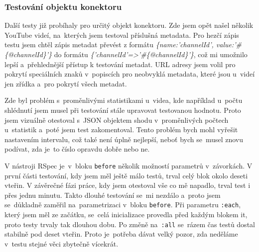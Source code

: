 \subsubsection{Testování objektu konektoru}
\par Další testy již probíhaly pro určitý objekt konektoru. Zde jsem opět našel několik YouTube videí, na~kterých jsem testoval příslušná metadata. Pro hezčí zápis testu jsem chtěl zápis metadat převést z formátu \textit{\{name:'channelId', value:'\#\{@channelId\}'\}} do formátu \textit{\{'channelId'=>'\#\{@channelId\}'\}}, což mi umožnilo lepší a~přehlednější přístup k testování metadat. URL adresy jsem volil pro pokrytí speciálních znaků v~popiscích pro neobvyklá metadata, které jsou u~videí jen zřídka a~pro pokrytí všech metadat. 
\par Zde byl problém s~proměnlivými statistikami u~videa, kde například u~počtu shlédnutí jsem musel při testování stále upravovat testovanou hodnotu. Proto jsem vizuálně otestoval s~JSON objektem shodu v~proměnlivých počtech u~statistik a~poté jsem test zakomentoval. Tento problém bych mohl vyřešit nastavením intervalu, což také není úplně nejlepší, neboť bych se~musel znovu podívat, zda je~to číslo opravdu dobře nebo ne.
\par V nástroji RSpec je~v~bloku \texttt{before} několik možností parametrů v~závorkách. V první části testování, kdy jsem měl ještě málo testů, trval celý blok okolo deseti vteřin. V závěrečné fázi práce, kdy jsem otestoval vše co mě napadlo, trval test i přes jednu minutu. Takto dlouhé testování se~mi nezdálo a~proto jsem se~důkladně zaměřil na~parametrizaci v~bloku \texttt{before}. Při parametru \texttt{:each}, který jsem měl ze začátku, se~celá inicializace provedla před každým blokem it, proto testy trvaly tak dlouhou dobu. Po změně na~\texttt{:all} se~rázem čas testů dostal stabilně pod deset vteřin. Proto je~potřeba dávat velký pozor, zda neděláme v~testu stejné věci zbytečně vícekrát.
